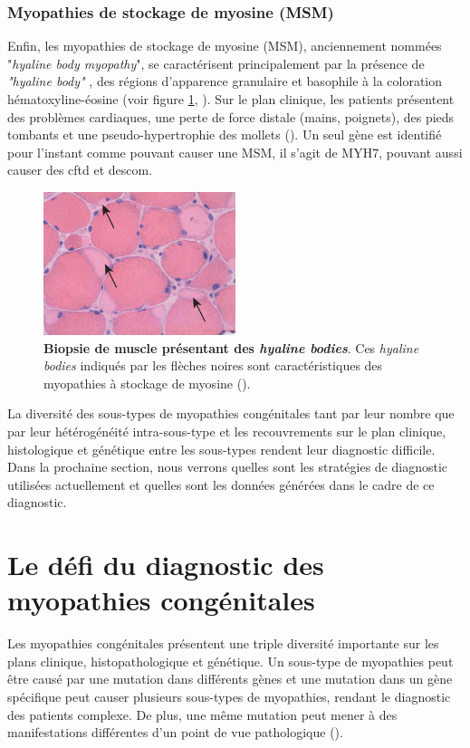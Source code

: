 \subsubsection{Myopathies de stockage de myosine (MSM)}
Enfin, les myopathies de stockage de myosine (MSM), anciennement nommées "\textit{hyaline body myopathy}", se caractérisent principalement  par la présence de \textit{"hyaline body"} , des régions d'apparence granulaire et basophile à la coloration hématoxyline-éosine (voir figure \ref{fig:hyaline}, \cite{claeys_congenital_2020, victor_dubowitz_muscle_2020}).  Sur le plan clinique, les patients présentent des problèmes cardiaques, une perte de force distale (mains, poignets), des pieds tombants et une pseudo-hypertrophie des mollets (\cite{cassandrini_congenital_2017}). Un seul gène est identifié pour l'instant comme pouvant causer une MSM, il s'agit de MYH7, pouvant aussi causer des \gls{cftd} et des\gls{com}.
\begin{figure}[!ht]
 \centering
 \includegraphics[width=0.5\textwidth]{figures/hyalin.jpg}
 \caption[Biopsie de muscle des \textit{hyaline bodies}]{\textbf{Biopsie de muscle présentant des \textit{hyaline bodies}}. Ces \textit{hyaline bodies }indiqués par les flèches noires sont caractéristiques des myopathies à stockage de myosine (\cite{victor_dubowitz_muscle_2020}).}
 \label{fig:hyaline}
\end{figure}

La diversité des sous-types de myopathies congénitales tant par leur nombre que par leur hétérogénéité intra-sous-type et les recouvrements sur le plan clinique, histologique et génétique entre les sous-types rendent leur diagnostic difficile. Dans la prochaine section, nous verrons quelles sont les stratégies de diagnostic utilisées actuellement et quelles sont les données générées dans le cadre de ce diagnostic.

\section{Le défi du diagnostic des myopathies congénitales}
Les myopathies congénitales présentent une triple diversité importante sur les plans clinique, histopathologique et génétique. Un sous-type de myopathies peut être causé par une mutation dans différents gènes et une mutation dans un gène spécifique peut causer plusieurs sous-types de myopathies, rendant le diagnostic des patients complexe. De plus, une même mutation peut mener à des manifestations différentes d'un point de vue pathologique (\cite{north_approach_2014}). 

